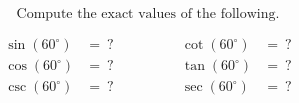 $$
\text{Compute the exact values of the following.}
$$

$$
\begin{align*}
  \sin(60^{\circ}) &=\ ? \qquad&\qquad \cot(60^{\circ}) &=\ ? \\[2ex]
  \cos(60^{\circ}) &=\ ? \qquad&\qquad \tan(60^{\circ}) &=\ ? \\[2ex]
  \csc(60^{\circ}) &=\ ? \qquad&\qquad \sec(60^{\circ}) &=\ ?
\end{align*}
$$
